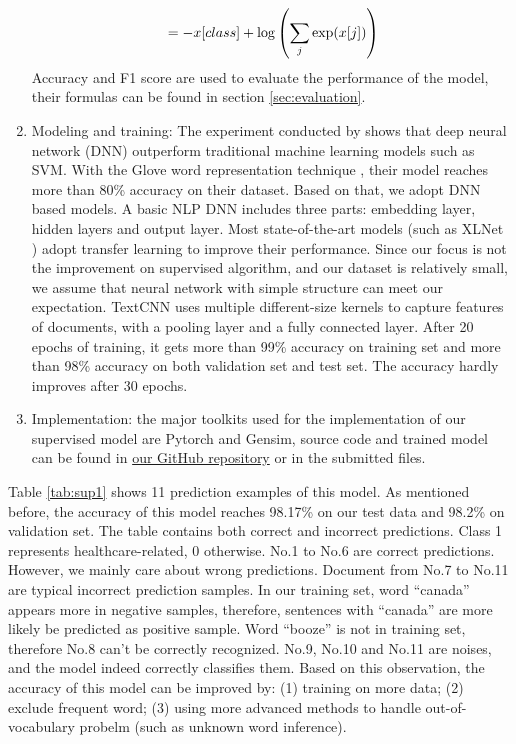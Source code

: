\begin{enumerate}
$$    \\                     = -x[class] + \log\left(\sum_j \exp(x[j])\right)$$
    Accuracy and F1 score are used to evaluate the performance of the model, their formulas can be found in section \ref{sec:evaluation}.
    \item Modeling and training: The experiment conducted by \cite{serban2019real} shows that deep neural network (DNN) outperform traditional machine learning models such as SVM. With the Glove word representation technique \cite{pennington2014glove}, their model reaches more than 80\% accuracy on their dataset. Based on that, we adopt DNN based models. A basic NLP DNN includes three parts: embedding layer, hidden layers and output layer. Most state-of-the-art models (such as XLNet \cite{yang2019xlnet}) adopt transfer learning to improve their performance. Since our focus is not the improvement on supervised algorithm, and our dataset is relatively small, we assume that neural network with simple structure can meet our expectation. TextCNN \cite{kim2014convolutional} uses multiple different-size kernels to capture features of documents, with a pooling layer and a fully connected layer. After 20 epochs of training, it gets more than 99\% accuracy on training set and more than 98\% accuracy on both validation set and test set. The accuracy hardly improves after 30 epochs. 
    \item Implementation: the major toolkits used for the implementation of our supervised model are Pytorch and Gensim, source code and trained model can be found in \href{https://github.com/NonBee98/FYP}{our GitHub repository} or in the submitted files.
\end{enumerate}
Table \ref{tab:sup1} shows 11 prediction examples of this model. As mentioned before, the accuracy of this model reaches 98.17\% on our test data and 98.2\% on validation set. The table contains both correct and incorrect predictions. Class 1 represents healthcare-related, 0 otherwise. No.1 to No.6 are correct predictions. However, we mainly care about wrong predictions. Document from No.7 to No.11 are typical incorrect prediction samples. In our training set, word ``canada'' appears more in negative samples, therefore, sentences with ``canada'' are more likely be predicted as positive sample. Word ``booze'' is not in training set, therefore No.8 can't be correctly recognized. No.9, No.10 and No.11 are noises, and the model indeed correctly classifies them. Based on this observation, the accuracy of this model can be improved by: (1) training on more data; (2) exclude frequent word; (3) using more advanced methods to handle out-of-vocabulary probelm (such as unknown word inference). 
